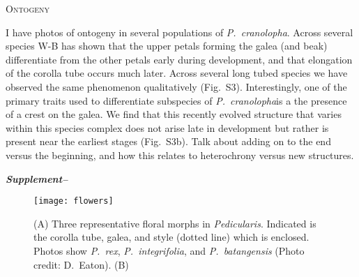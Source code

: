 \documentclass[12pt,letterpaper]{article}
\def\PC{\emph{P.~cranolopha}}
\def\P{\emph{Pedicularis}}
\renewcommand{\section}[1]{%
\bigskip
\begin{center}
\begin{large}
\normalfont\scshape #1
\medskip
\end{large}
\end{center}}
\renewcommand{\subsection}[1]{%
\bigskip
{\noindent \normalfont \bf \emph{#1}}
}
\begin{document}

\section{Ontogeny}
I have photos of ontogeny in several populations of \PC. Across several species 
W-B has shown that the upper petals forming the galea (and beak) differentiate 
from the other petals early during development, and that elongation of the 
corolla tube occurs much later. Across several long tubed species we have 
observed the same phenomenon qualitatively (Fig.~S3). Interestingly, one 
of the primary traits used to differentiate subspecies of \PC is a 
the presence of a crest on the galea. We find that this recently evolved
structure that varies within this species complex does not arise late in 
development but rather is present near the earliest stages (Fig.~S3b). 
Talk about adding on to the end versus the beginning, and how this relates
to heterochrony versus new structures. 

\subsection{Supplement--}




\clearpage
\newpage

\begin{figure}
\centering
\texttt{[image: flowers]}
\caption{(A) Three representative floral morphs in \P. 
Indicated is the corolla tube, galea, and
style (dotted line) which is enclosed.
Photos show \emph{P.~rex}, \emph{P.~integrifolia},
and \emph{P.~batangensis} (Photo credit: D.~Eaton).
(B) } 
\label{fig:1}
\end{figure}
\end{document}
